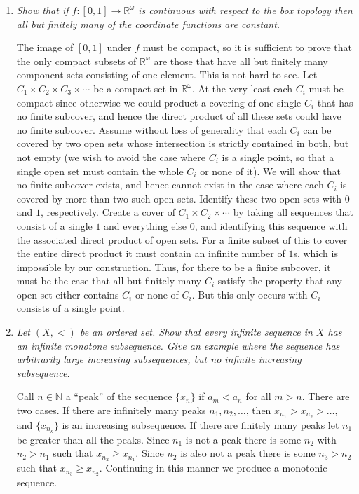 \documentclass[10pt]{article}
\newcommand{\N}{\mathbb{N}}
\newcommand{\R}{\mathbb{R}}
\begin{document}
\begin{enumerate}
\item \emph{Show that if $f:[0,1] \rightarrow \R^\omega$ is continuous with respect to the box topology then all but finitely many of the coordinate functions are constant.}

The image of $[0,1]$ under $f$ must be compact, so it is sufficient to prove that the only compact subsets of $\R^\omega$ are those that have all but finitely many component sets consisting of one element.  This is not hard to see.  Let $C_1 \times C_2 \times C_3 \times \cdots$ be a compact set in $\R^\omega$.  At the very least each $C_i$ must be compact since otherwise we could product a covering of one single $C_i$ that has no finite subcover, and hence the direct product of all these sets could have no finite subcover.  Assume without loss of generality that each $C_i$ can be covered by two open sets whose intersection is strictly contained in both, but not empty (we wish to avoid the case where $C_i$ is a single point, so that a single open set must contain the whole $C_i$ or none of it).  We will show that no finite subcover exists, and hence cannot exist in the case where each $C_i$ is covered by more than two such open sets.  Identify these two open sets with $0$ and $1$, respectively.  Create a cover of $C_1 \times C_2 \times \cdots$ by taking all sequences that consist of a single $1$ and everything else $0$, and identifying this sequence with the associated direct product of open sets.  For a finite subset of this to cover the entire direct product it must contain an infinite number of $1$s, which is impossible by our construction.  Thus, for there to be a finite subcover, it must be the case that all but finitely many $C_i$ satisfy the property that any open set either contains $C_i$ or none of $C_i$.  But this only occurs with $C_i$ consists of a single point.

\item \emph{Let $(X, <)$ be an ordered set.  Show that every infinite sequence in $X$ has an infinite monotone subsequence.  Give an example where the sequence has arbitrarily large increasing subsequences, but no infinite increasing subsequence.}

Call $n \in \N$ a ``peak'' of the sequence $\{x_n\}$ if $a_m < a_n$ for all $m > n$.  There are two cases.  If there are infinitely many peaks $n_1, n_2, \ldots$, then $x_{n_1} > x_{n_2} > \ldots$, and $\{x_{n_k}\}$ is an increasing subsequence.  If there are finitely many peaks let $n_1$ be greater than all the peaks.  Since $n_1$ is not a peak there is some $n_2$ with $n_2 > n_1$ such that $x_{n_2} \geq x_{n_1}$.  Since $n_2$ is also not a peak there is some $n_3 > n_2$ such that $x_{n_3} \geq x_{n_2}$.  Continuing in this manner we produce a monotonic sequence.

\end{enumerate}
\end{document}

